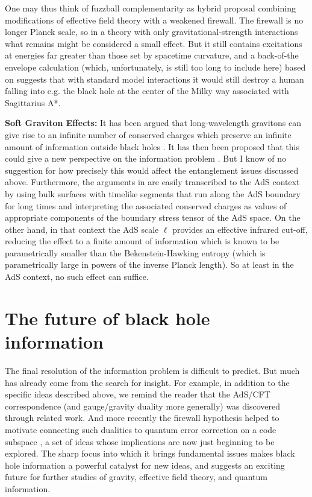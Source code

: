 \documentclass[12pt]{article}
\begin{document}
One may thus think of fuzzball complementarity as hybrid proposal combining modifications of effective field theory with a weakened firewall.  The firewall is no longer Planck scale, so in a theory with only gravitational-strength interactions what remains might be considered a small effect.  But it still contains excitations at energies far greater than those set by spacetime curvature, and a back-of-the envelope calculation (which, unfortunately, is still too long to include here) based on \cite{Amsel:2007cw} suggests that with standard model interactions it would still destroy a human falling into e.g. the black hole at the center of the Milky way associated with Sagittarius A*.

{\bf Soft Graviton Effects:} It has been argued that long-wavelength gravitons can give rise to an infinite number of conserved charges which preserve an infinite amount of information outside black holes \cite{Strominger:2013jfa}.   It has then been proposed that this could give a new perspective on the information problem  \cite{Hawking:2016msc,Hawking:2016sgy}.   But I know of no suggestion for how precisely this would affect the entanglement issues discussed above.  Furthermore, the arguments in  \cite{Hawking:2016msc} are easily transcribed to the AdS context by using bulk surfaces with timelike segments that run along the AdS boundary for long times and interpreting the associated conserved charges as values of appropriate components of the boundary stress tensor of the AdS space.  On the other hand, in that context the AdS scale $\ell$ provides an effective infrared cut-off, reducing the effect to a finite amount of information which is known to be parametrically smaller than the Bekenstein-Hawking entropy (which is parametrically large in powers of the inverse Planck length).  So at least in the AdS context, no such effect can suffice.


\section{The future of black hole information}

The final resolution of the information problem is difficult to predict.  But much has already come from the search for insight. For example, in addition to the specific ideas described above, we remind the reader that the AdS/CFT correspondence \cite{Maldacena:1997re} (and gauge/gravity duality more generally) was discovered through related work.  And more recently the firewall hypothesis helped to motivate connecting such dualities to quantum error correction on a code subspace \cite{Almheiri:2014lwa}, a set of ideas whose implications are now just beginning to be explored.  The sharp focus into which it brings fundamental issues makes black hole information a powerful catalyst for new ideas, and suggests an exciting future for further studies of gravity, effective field theory, and quantum information.
\end{document}
